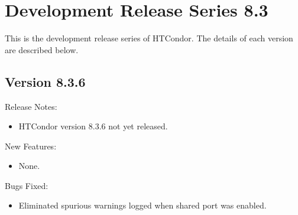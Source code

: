 
\section{\label{sec:History-8-3}Development Release Series 8.3}

This is the development release series of HTCondor.
The details of each version are described below.

\subsection*{\label{sec:New-8-3-6}Version 8.3.6}

\noindent Release Notes:

\begin{itemize}

\item HTCondor version 8.3.6 not yet released.

\end{itemize}


\noindent New Features:

\begin{itemize}

\item None.

\end{itemize}

\noindent Bugs Fixed:

\begin{itemize}

\item Eliminated spurious warnings logged when shared port was enabled.

\end{itemize}

